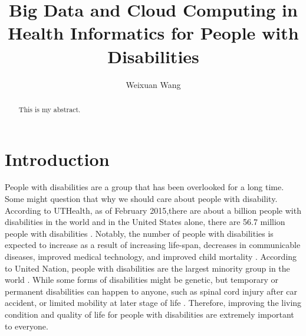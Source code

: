 \documentclass[sigconf]{acmart}
\begin{document}
\title{Big Data and Cloud Computing in Health Informatics for People with Disabilities}


\author{Weixuan Wang}


\renewcommand{\shortauthors}{W. Wang}


\begin{abstract}
This is my abstract.
\end{abstract}



\maketitle



\section{Introduction}
People with disabilities are a group that has been overlooked for a long time. Some might question that why we should care about people with disability. According to UTHealth, as of February 2015,there are about a billion people with disabilities in the world and in the United States alone, there are 56.7 million people with disabilities \cite{Lex}. Notably, the number of people with disabilities is expected to increase as a result of increasing life-span, decreases in communicable diseases, improved medical technology, and improved child mortality \cite{SMITH1987376}. According to United Nation, people with disabilities are the largest minority group in the world \cite{Appleyard2005,DARCY2010816,Lex}. While some forms of disabilities might be genetic, but temporary or permanent disabilities can happen to anyone, such as spinal cord injury after car accident, or limited mobility at later stage of life \cite{Lex}. Therefore, improving the living condition and quality of life for people with disabilities are extremely important to everyone.
\end{document}

